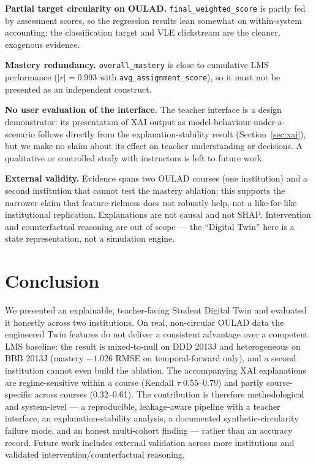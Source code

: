 \documentclass[conference]{IEEEtran}
\begin{document}
\textbf{Partial target circularity on OULAD.} \texttt{final\_weighted\_score} is
partly fed by assessment scores, so the regression results lean somewhat on
within-system accounting; the classification target and VLE clickstream are the
cleaner, exogenous evidence.

\textbf{Mastery redundancy.} \texttt{overall\_mastery} is close to cumulative LMS
performance ($|r| = 0.993$ with \texttt{avg\_assignment\_score}), so it must not
be presented as an independent construct.

\textbf{No user evaluation of the interface.} The teacher interface is a design
demonstrator: its presentation of XAI output as model-behaviour-under-a-scenario
follows directly from the explanation-stability result (Section~\ref{sec:xai}),
but we make no claim about its effect on teacher understanding or decisions. A
qualitative or controlled study with instructors is left to future work.

\textbf{External validity.} Evidence spans two OULAD courses (one institution)
and a second institution that cannot test the mastery ablation; this supports the
narrower claim that feature-richness does not robustly help, not a like-for-like
institutional replication. Explanations are not causal and not SHAP. Intervention
and counterfactual reasoning are out of scope --- the ``Digital Twin'' here is a
state representation, not a simulation engine.

\section{Conclusion}
We presented an explainable, teacher-facing Student Digital Twin and evaluated it
honestly across two institutions. On real, non-circular OULAD data the engineered
Twin features do not deliver a consistent advantage over a competent LMS
baseline: the result is mixed-to-null on DDD 2013J and heterogeneous on BBB 2013J
(mastery $-1.026$ RMSE on temporal-forward only), and a second institution cannot
even build the ablation. The accompanying XAI explanations are regime-sensitive
within a course (Kendall $\tau$ 0.55--0.79) and partly course-specific across
courses (0.32--0.61). The contribution is therefore methodological and
system-level --- a reproducible, leakage-aware pipeline with a teacher interface,
an explanation-stability analysis, a documented synthetic-circularity failure
mode, and an honest multi-cohort finding --- rather than an accuracy record.
Future work includes external validation across more institutions and validated
intervention/counterfactual reasoning.
\end{document}
